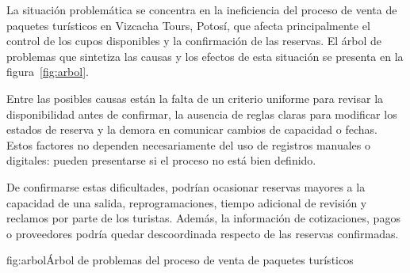 \label{cap:situacion}

La situación problemática se concentra en la ineficiencia del proceso de
venta de paquetes turísticos en Vizcacha Tours, Potosí, que afecta
principalmente el control de los cupos disponibles y la confirmación de las
reservas. El árbol de problemas que sintetiza las causas y los efectos de
esta situación se presenta en la figura~\ref{fig:arbol}.

Entre las posibles causas están la falta de un criterio uniforme para revisar
la disponibilidad antes de confirmar, la ausencia de reglas claras para
modificar los estados de reserva y la demora en comunicar cambios de
capacidad o fechas. Estos factores no dependen necesariamente del uso de
registros manuales o digitales: pueden presentarse si el proceso no está bien
definido.

De confirmarse estas dificultades, podrían ocasionar reservas mayores a la
capacidad de una salida, reprogramaciones, tiempo adicional de revisión y
reclamos por parte de los turistas. Además, la información de cotizaciones,
pagos o proveedores podría quedar descoordinada respecto de las reservas
confirmadas.

\begin{landscape}
\thispagestyle{paisaje}
\begin{figuraapa}{fig:arbol}{Árbol de problemas del proceso de venta de paquetes turísticos}
\centering
\scalebox{0.85}{}
\vspace{2pt}
\begin{minipage}{0.88\linewidth}
\end{minipage}
\end{figuraapa}
\end{landscape}
